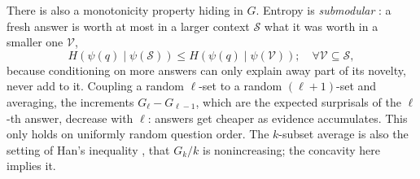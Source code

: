 \documentclass[11pt]{article}
\begin{document}
There is also a monotonicity property hiding in $G$. Entropy is
\emph{submodular} \cite{fujishige78,covthomas}: a fresh answer is worth at most in a larger
context $\mathcal{S}$ what it was worth in a smaller one $\mathcal{V}$,
%
\begin{equation}
H(\psi(q) \mid \psi(\mathcal S)) \le H(\psi(q) \mid \psi(\mathcal V));\quad \forall \mathcal V \subseteq \mathcal S,
\end{equation}
%
because conditioning on more
answers can only explain away part of its novelty, never add to it.
Coupling a random $\ell$-set to a random $(\ell{+}1)$-set and
averaging, the increments $G_\ell - G_{\ell-1}$, which are the
expected surprisals of the $\ell$-th answer, decrease with $\ell$:
answers get cheaper as evidence accumulates. This only holds on uniformly random question order.
The $k$-subset average is also the setting of Han's inequality
\cite{han78}, that $G_k/k$ is nonincreasing; the concavity here implies
it.
\end{document}
